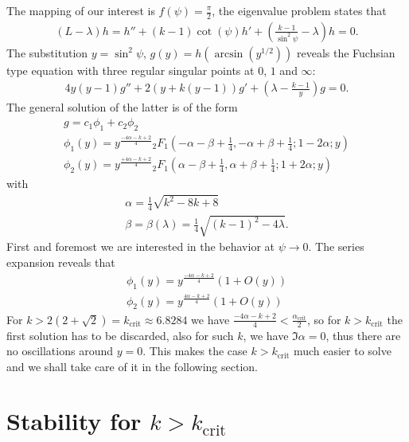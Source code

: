The mapping of our interest is $f(\psi)=\frac{\pi}{2}$, the eigenvalue
problem states that
\begin{gather}\label{eq:problem}
  (L-\lambda)h=h''+(k-1)\cot(\psi)h'+\left(\frac{k-1}{\sin^2\psi}-\lambda\right)h=0.
\end{gather}
The substitution $y=\sin^2\psi$, $g(y)=h(\arcsin(y^{1/2}))$ reveals
the Fuchsian type equation with three regular singular points at $0$,
$1$ and $\infty$:
\begin{gather}
  4y(y-1)g''+2(y+k(y-1))g'+(\lambda-\frac{k-1}{y})g=0.
\end{gather}
The general solution of the latter is of the form
\begin{gather}
  g=c_1\phi_1+c_2\phi_2\\
  \phi_1(y)=y^{\frac{-4\alpha-k+2}{4}}{}_2F_1 \left(-\alpha-\beta+\frac{1}{4},-\alpha+\beta+\frac{1}{4};1-2\alpha;y\right)\\
  \phi_2(y)=y^{\frac{+4\alpha-k+2}{4}}{}_2F_1 \left(\alpha-\beta+\frac{1}{4},\alpha+\beta+\frac{1}{4};1+2\alpha;y\right)\label{eq:sol}
\end{gather}
with
\begin{gather}
  \alpha=\frac{1}{4}\sqrt{k^2-8 k+8}\\
  \beta=\beta(\lambda)=\frac{1}{4}\sqrt{(k-1)^2-4\lambda}.
\end{gather}
First and foremost we are interested in the behavior at
$\psi\rightarrow0$. The series expansion reveals that
\begin{gather}
  \phi_1(y)=y^{\frac{-4\alpha-k+2}{4}}(1+O(y))\\
  \phi_2(y)=y^{\frac{4\alpha-k+2}{4}}(1+O(y))
\end{gather}
For $k>2(2+\sqrt{2})=k_{\text{crit}}\approx6.8284$ we have
$\frac{-4\alpha-k+2}{4}<\frac{\alpha_{\text{crit}}}{2}$, so for
$k>k_{\text{crit}}$ the first solution has to be discarded, also for
such $k$, we have $\Im{\alpha}=0$, thus there are no oscillations
around $y=0$. This makes the case $k>k_{\text{crit}}$ much easier to
solve and we shall take care of it in the following section.

\section*{Stability for $k>k_{\text{crit}}$}

